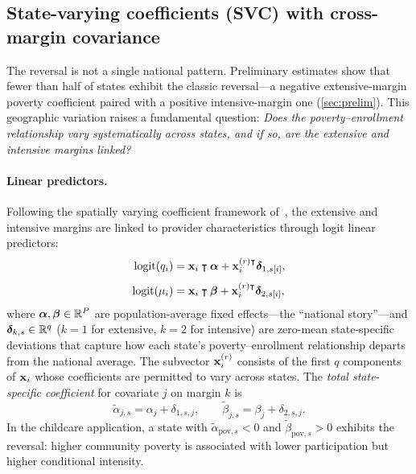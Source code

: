 
\subsection{State-varying coefficients (SVC) with cross-margin covariance}\label{sec:svc}

The reversal is not a single national pattern. Preliminary estimates
show that fewer than half of states exhibit the classic reversal---a negative
extensive-margin poverty coefficient paired with a positive intensive-margin
one (\cref{sec:prelim}). This geographic variation raises a fundamental
question: \emph{Does the poverty--enrollment relationship vary systematically
across states, and if so, are the extensive and intensive margins linked?}

\paragraph{Linear predictors.}
Following the spatially varying coefficient framework of~\citet{GelfandEtAl2003},
the extensive and intensive margins are linked to provider characteristics
through logit linear predictors:
\begin{align}
  \operatorname{logit}(q_i)
    &= \mathbf{x}_i\intercal\boldsymbol{\alpha} + \mathbf{x}_i^{(r)\intercal}\boldsymbol{\delta}_{1,s[i]},
    \label{eq:eta-ext} \\[4pt]
  \operatorname{logit}(\mu_i)
    &= \mathbf{x}_i\intercal\boldsymbol{\beta} + \mathbf{x}_i^{(r)\intercal}\boldsymbol{\delta}_{2,s[i]},
    \label{eq:eta-int}
\end{align}
where $\boldsymbol{\alpha}, \boldsymbol{\beta} \in \mathbb{R}^P$ are population-average fixed effects---the
``national story''---and $\boldsymbol{\delta}_{k,s} \in \mathbb{R}^q$
($k = 1$ for extensive, $k = 2$ for intensive) are zero-mean state-specific
deviations that capture how each state's poverty--enrollment relationship
departs from the national average. The subvector $\mathbf{x}_i^{(r)}$ consists of
the first $q$ components of $\mathbf{x}_i$ whose coefficients are permitted to vary
across states.
The \emph{total state-specific coefficient} for covariate $j$ on margin $k$ is
\begin{equation}\label{eq:total-coef}
  \tilde{\alpha}_{j,s} = \alpha_j + \delta_{1,s,j},
  \qquad
  \tilde{\beta}_{j,s} = \beta_j + \delta_{2,s,j}.
\end{equation}
In the childcare application, a state with $\tilde{\alpha}_{\mathrm{pov},s} < 0$
and $\tilde{\beta}_{\mathrm{pov},s} > 0$ exhibits the reversal: higher
community poverty is associated with lower participation but higher conditional
intensity.

